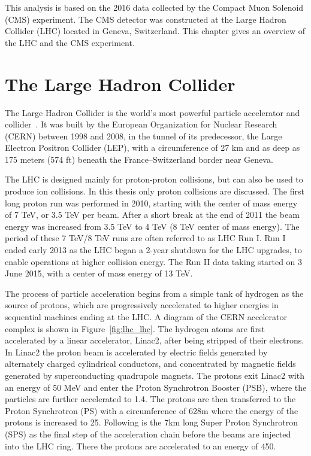 
This analysis is based on the 2016 data collected by the Compact Muon Solenoid (CMS) experiment. The CMS detector was constructed at the Large Hadron Collider (LHC) located in Geneva, Switzerland. This chapter gives an overview of the LHC and the CMS experiment.

\section{The Large Hadron Collider} 
The Large Hadron Collider is the world's most powerful particle accelerator and collider~\cite{lhc_lhcmachine,lhc_lhcreport}. It was built by the European Organization for Nuclear Research (CERN) between 1998 and 2008, in the tunnel of its predecessor, the Large Electron Positron Collider (LEP), with a circumference of 27 km and as deep as 175 meters (574 ft) beneath the France–Switzerland border near Geneva. 

\vspace{0.3cm}
The LHC is designed mainly for proton-proton collisions, but can also be used to produce ion collisions. In this thesis only proton collisions are discussed. The first long proton run was performed in 2010, starting with the center of mass energy of 7 TeV, or 3.5 TeV per beam. After a short break at the end of 2011 the beam energy was increased from 3.5 TeV to 4 TeV (8 TeV center of mass energy). The period of these 7 TeV/8 TeV runs are often referred to as LHC Run I. Run I ended early 2013 as the LHC began a 2-year shutdown for the LHC upgrades, to enable operations at higher collision energy. The Run II data taking started on 3 June 2015, with a center of mass energy of 13 TeV. 

\vspace{0.3cm}
The process of particle acceleration begins from a simple tank of hydrogen as the source of protons, which are progressively accelerated to higher energies in sequential machines ending at the LHC. A diagram of the CERN accelerator complex is shown in Figure~\ref{fig:lhc_lhc}. The hydrogen atoms are first accelerated by a linear accelerator, Linac2, after being stripped of their electrons. In Linac2 the proton beam is accelerated by electric fields generated by alternately charged cylindrical conductors, and concentrated by magnetic fields generated by superconducting quadrupole magnets. The protons exit Linac2 with an energy of 50 MeV and enter the Proton Synchrotron Booster (PSB), where the particles are further accelerated to 1.4\GeV. The protons are then transferred to the Proton Synchrotron (PS) with a circumference of 628m where the energy of the protons is increased to 25\GeV. Following is the 7km long Super Proton Synchrotron (SPS) as the final step of the acceleration chain before the beams are injected into the LHC ring. There the protons are accelerated to an energy of 450\GeV.

